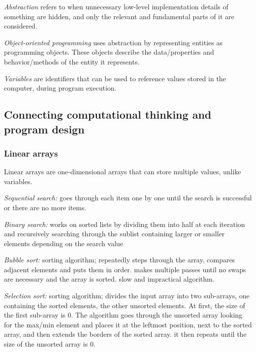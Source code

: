 \documentclass{article}
\begin{document}
\textit{Abstraction} refers to when unnecessary low-level implementation
details of something are hidden, and only the relevant and fundamental parts
of it are considered.

\textit{Object-oriented programming} uses abstraction by representing entities
as programming objects. These objects describe the data/properties and
behavior/methods of the entity it represents.

\textit{Variables} are identifiers that can be used to reference values stored
in the computer, during program execution.

\subsection{Connecting computational thinking and program design}

\subsubsection{Linear arrays}
Linear arrays are one-dimensional arrays that can store multiple
values, unlike variables.

\textit{Sequential search:} goes through each item one by one until the search
is successful or there are no more items.

\textit{Binary search:} works on sorted lists by dividing them into half at
each iteration and recursively searching through the sublist containing larger
or smaller elements depending on the search value

\textit{Bubble sort:} sorting algorithm; repeatedly steps through the array,
compares adjacent elements and puts them in order. makes multiple passes until
no swaps are necessary and the array is sorted. slow and impractical algorithm.

\textit{Selection sort:} sorting algorithm; divides the input array into two
sub-arrays, one containing the sorted elements, the other unsorted elements. At
first, the size of the first sub-array is 0. The algorithm goes through the
unsorted array looking for the max/min element and places it at the leftmost
position, next to the sorted array, and then extends the borders of the sorted
array. it then repeats until the size of the unsorted array is 0.
\end{document}
